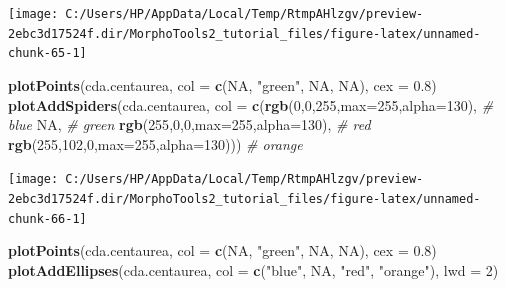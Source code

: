 \documentclass[
]{article}
\newenvironment{Shaded}{\begin{snugshade}}{\end{snugshade}}
\newcommand{\CommentTok}[1]{\textcolor[rgb]{0.56,0.35,0.01}{\textit{#1}}}
\newcommand{\DataTypeTok}[1]{\textcolor[rgb]{0.13,0.29,0.53}{#1}}
\newcommand{\DecValTok}[1]{\textcolor[rgb]{0.00,0.00,0.81}{#1}}
\newcommand{\FloatTok}[1]{\textcolor[rgb]{0.00,0.00,0.81}{#1}}
\newcommand{\KeywordTok}[1]{\textcolor[rgb]{0.13,0.29,0.53}{\textbf{#1}}}
\newcommand{\NormalTok}[1]{#1}
\newcommand{\OtherTok}[1]{\textcolor[rgb]{0.56,0.35,0.01}{#1}}
\newcommand{\StringTok}[1]{\textcolor[rgb]{0.31,0.60,0.02}{#1}}
\begin{document}
\begin{center}\texttt{[image: C:/Users/HP/AppData/Local/Temp/RtmpAHlzgv/preview-2ebc3d17524f.dir/MorphoTools2\_tutorial\_files/figure-latex/unnamed-chunk-65-1]} \end{center}

\begin{Shaded}
\begin{Highlighting}[]
\KeywordTok{plotPoints}\NormalTok{(cda.centaurea, }\DataTypeTok{col =} \KeywordTok{c}\NormalTok{(}\OtherTok{NA}\NormalTok{, }\StringTok{"green"}\NormalTok{, }\OtherTok{NA}\NormalTok{, }\OtherTok{NA}\NormalTok{), }\DataTypeTok{cex =} \FloatTok{0.8}\NormalTok{)}
\KeywordTok{plotAddSpiders}\NormalTok{(cda.centaurea, }\DataTypeTok{col =} \KeywordTok{c}\NormalTok{(}\KeywordTok{rgb}\NormalTok{(}\DecValTok{0}\NormalTok{,}\DecValTok{0}\NormalTok{,}\DecValTok{255}\NormalTok{,}\DataTypeTok{max=}\DecValTok{255}\NormalTok{,}\DataTypeTok{alpha=}\DecValTok{130}\NormalTok{), }\CommentTok{# blue}
                                      \OtherTok{NA}\NormalTok{, }\CommentTok{# green}
                                      \KeywordTok{rgb}\NormalTok{(}\DecValTok{255}\NormalTok{,}\DecValTok{0}\NormalTok{,}\DecValTok{0}\NormalTok{,}\DataTypeTok{max=}\DecValTok{255}\NormalTok{,}\DataTypeTok{alpha=}\DecValTok{130}\NormalTok{), }\CommentTok{# red}
                                      \KeywordTok{rgb}\NormalTok{(}\DecValTok{255}\NormalTok{,}\DecValTok{102}\NormalTok{,}\DecValTok{0}\NormalTok{,}\DataTypeTok{max=}\DecValTok{255}\NormalTok{,}\DataTypeTok{alpha=}\DecValTok{130}\NormalTok{))) }\CommentTok{# orange}
\end{Highlighting}
\end{Shaded}

\begin{center}\texttt{[image: C:/Users/HP/AppData/Local/Temp/RtmpAHlzgv/preview-2ebc3d17524f.dir/MorphoTools2\_tutorial\_files/figure-latex/unnamed-chunk-66-1]} \end{center}

\begin{Shaded}
\begin{Highlighting}[]
\KeywordTok{plotPoints}\NormalTok{(cda.centaurea, }\DataTypeTok{col =} \KeywordTok{c}\NormalTok{(}\OtherTok{NA}\NormalTok{, }\StringTok{"green"}\NormalTok{, }\OtherTok{NA}\NormalTok{, }\OtherTok{NA}\NormalTok{), }\DataTypeTok{cex =} \FloatTok{0.8}\NormalTok{)}
\KeywordTok{plotAddEllipses}\NormalTok{(cda.centaurea, }\DataTypeTok{col =} \KeywordTok{c}\NormalTok{(}\StringTok{"blue"}\NormalTok{, }\OtherTok{NA}\NormalTok{, }\StringTok{"red"}\NormalTok{, }\StringTok{"orange"}\NormalTok{), }\DataTypeTok{lwd =} \DecValTok{2}\NormalTok{)}
\end{Highlighting}
\end{Shaded}
\end{document}
